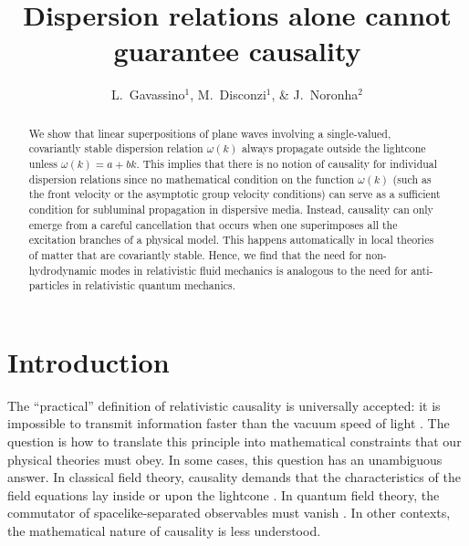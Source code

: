 \documentclass[prl, amsfonts, amssymb, amsmath, nofootinbib,reprint, showkeys, twoside,notitlepage]{revtex4-2}
\theoremstyle{definition}
\theoremstyle{theorem}
\theoremstyle{corollary}
\begin{document}
\title{Dispersion relations alone cannot guarantee causality}
\author{L.~Gavassino$^1$, M.~Disconzi$^{1}$, \& J.~Noronha$^2$}


\begin{abstract}
We show that linear superpositions of plane waves involving a single-valued, covariantly stable dispersion relation $\omega(k)$ always propagate outside the lightcone unless $\omega(k) =a+b k$. This implies that there is no notion of causality for individual dispersion relations since no mathematical condition on the function $\omega(k)$ (such as the front velocity or the asymptotic group velocity conditions) can serve as a sufficient condition for subluminal propagation in dispersive media. Instead, causality can only emerge from a careful cancellation that occurs when one superimposes all the excitation branches of a physical model. This happens automatically in local theories of matter that are covariantly stable. Hence, we find that the need for non-hydrodynamic modes in relativistic fluid mechanics is analogous to the need for anti-particles in relativistic quantum mechanics.
\end{abstract} 



\maketitle


\section{Introduction}
The ``practical'' definition of relativistic causality is universally accepted: it is impossible to transmit information faster than the vacuum speed of light \cite{Einstein1908,Tolman_book,landau2}. The question is how to translate this principle into mathematical constraints that our physical theories must obey. In some cases, this question has an unambiguous answer. In classical field theory, causality demands that the characteristics of the field equations lay inside or upon the lightcone \cite{CourantHilbert2_book,Susskind1969,Hawking1973,Wald,Rauch_book}. In quantum field theory, the commutator of spacelike-separated observables must vanish \cite{Peskin_book,Eberhard1988,Keister1996}. 
In other contexts, the mathematical nature of causality is less understood.
\end{document}
